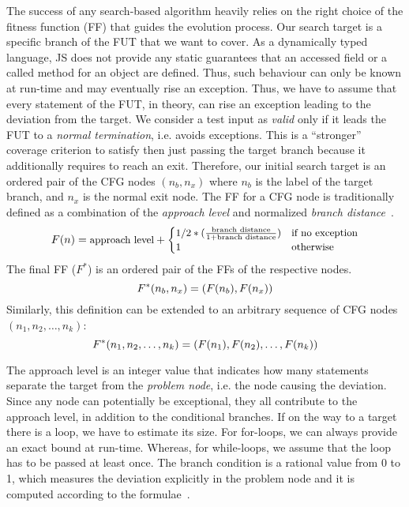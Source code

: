 The success of any search-based algorithm heavily relies on the right choice of the fitness function (FF) that guides the evolution process. Our search target is a specific branch of the FUT that we want to cover. As a dynamically typed language, JS does not provide any static guarantees that an accessed field or a called method for an object are defined. Thus, such behaviour can only be known at run-time and may eventually rise an exception. Thus, we have to assume that every statement of the FUT, in theory, can rise an exception leading to the deviation from the target. We consider a test input as \emph{valid} only if it leads the FUT to a \emph{normal termination}, i.e. avoids exceptions. This is a ``stronger'' coverage criterion to satisfy then just passing the target branch because it additionally requires to reach an exit. Therefore, our initial search target is an ordered pair of the CFG nodes $(n_b, n_x)$ where $n_b$ is the label of the target branch, and $n_x$ is the normal exit node. The FF for a CFG node is traditionally defined as a combination of the \emph{approach level} and normalized \emph{branch distance}~\cite{arcuri2010does}.
\begin{equation}
\footnotesize
F(n) = \text{approach level} +
\begin{cases}
 1/2 * (\frac{\text{branch distance}}{1 + \text{branch distance}}) & \text{if no exception}\\
 1                                  & \text{otherwise}
\end{cases}
\end{equation}
The final FF ($F^*$) is an ordered pair of the FFs of the respective nodes.
\begin{equation}
\footnotesize
F^*(n_b, n_x) = (F(n_b), F(n_x))
\end{equation}
Similarly, this definition can be extended to an arbitrary sequence of CFG nodes $(n_1, n_2, \ldots, n_k)$:
 \begin{equation}
\footnotesize
F^*(n_1, n_2, \ldots, n_k) = (F(n_1), F(n_2), \ldots, F(n_k))
\end{equation}

The approach level is an integer value that indicates how many statements separate the target from the \emph{problem node}, i.e. the node causing the deviation. Since any node can potentially be exceptional, they all contribute to the approach level, in addition to the conditional branches. If on the way to a target there is a loop, we have to estimate its size. For for-loops, we can always provide an exact bound at run-time. Whereas, for while-loops, we assume that the loop has to be passed at least once. The branch condition is a rational value from 0 to 1, which measures the deviation explicitly in the problem node and it is computed according to the formulae~\cite{tracey1998automated}.
